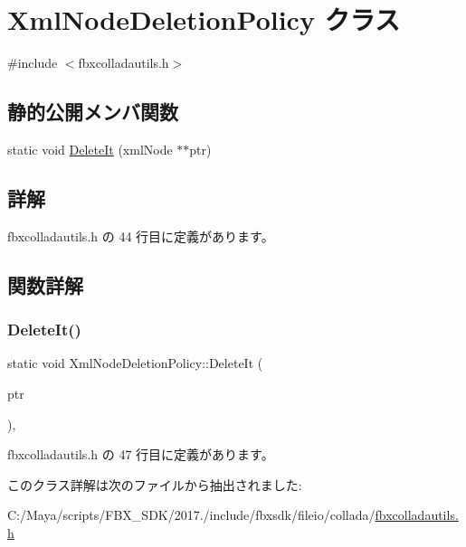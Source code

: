 \hypertarget{class_xml_node_deletion_policy}{}\section{Xml\+Node\+Deletion\+Policy クラス}
\label{class_xml_node_deletion_policy}


{\ttfamily \#include $<$fbxcolladautils.\+h$>$}

\subsection*{静的公開メンバ関数}
\begin{DoxyCompactItemize}
\item 
static void \hyperlink{class_xml_node_deletion_policy_ada232e48683ac2dd99af2b0782afcff8}{Delete\+It} (xml\+Node $\ast$$\ast$ptr)
\end{DoxyCompactItemize}


\subsection{詳解}


 fbxcolladautils.\+h の 44 行目に定義があります。



\subsection{関数詳解}
\mbox{\label{class_xml_node_deletion_policy_ada232e48683ac2dd99af2b0782afcff8}} 
\subsubsection{\texorpdfstring{Delete\+It()}{DeleteIt()}}
{\footnotesize\ttfamily static void Xml\+Node\+Deletion\+Policy\+::\+Delete\+It (\begin{DoxyParamCaption}\item[{xml\+Node $\ast$$\ast$}]{ptr }\end{DoxyParamCaption})\hspace{0.3cm}{\ttfamily [inline]}, {\ttfamily [static]}}



 fbxcolladautils.\+h の 47 行目に定義があります。



このクラス詳解は次のファイルから抽出されました\+:\begin{DoxyCompactItemize}
\item 
C\+:/\+Maya/scripts/\+F\+B\+X\+\_\+\+S\+D\+K/2017./include/fbxsdk/fileio/collada/\hyperlink{fbxcolladautils_8h}{fbxcolladautils.\+h}\end{DoxyCompactItemize}
